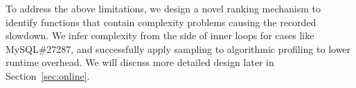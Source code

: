 To address the above limitations, 
we design a novel ranking mechanism to identify 
functions that contain complexity problems causing the recorded slowdown. 
We infer complexity from the side of inner loops 
for cases like MySQL\#27287, 
and successfully apply sampling to algorithmic 
profiling to lower runtime overhead.
We will discuss more detailed design 
later in Section~\ref{sec:online}. 

